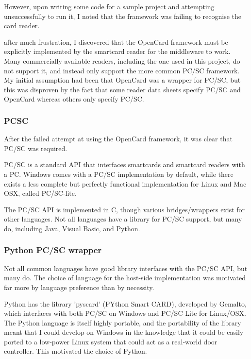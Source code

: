 \documentclass[12pt]{article}
\begin{document}
However, upon writing some code for a sample project and attempting unsuccessfully to run it, I noted that the framework was failing to recognise the card reader.

after much frustration, I discovered that the OpenCard framework must be explicitly implemented by the smartcard reader for the middleware to work. Many commercially available readers, including  the one used in this project, do not support it, and instead only support the more common PC/SC framework. My initial assumption had been that OpenCard was a wrapper for PC/SC, but this was disproven by the fact that some reader data sheets specify PC/SC and OpenCard whereas others only specify PC/SC.

\subsubsection{PCSC}
After the failed attempt at using the OpenCard framework, it was clear that PC/SC was required. 

PC/SC is a standard API that interfaces smartcards and smartcard readers with a PC. Windows comes with a PC/SC implementation by default, while there exists a less complete but perfectly functional implementation for Linux and Mac OSX, called PC/SC-lite. 

The PC/SC API is implemented in C, though various bridges/wrappers exist for other languages. Not all languages have a library for PC/SC support, but many do, including Java, Visual Basic, and Python.

\subsubsection{Python PC/SC wrapper}
\label{subsec:python_pcsc}


Not all common languages have good library interfaces with the PC/SC API, but many do. The choice of language for the host-side implementation was motivated far more by language preference than by necessity.

Python has the library 'pyscard' (PYthon Smart CARD), developed by Gemalto, which interfaces with both PC/SC on Windows and PC/SC Lite for Linux/OSX. The Python language is itself highly portable, and the portability of the library meant that I could develop on Windows in the knowledge that it could be easily ported to a low-power Linux system that could act as a real-world door controller. This motivated the choice of Python.
\end{document}
